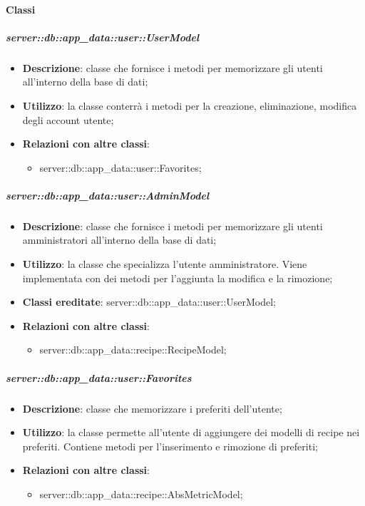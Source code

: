 	\paragraph{Classi} %

		\subparagraph{server::db::app\_data::user::UserModel} %
		\label{subp:server_db_app_data_user_user_model}
			\begin{itemize}
				\item \textbf{Descrizione}: classe che fornisce i metodi per memorizzare gli utenti all'interno della base di dati;
				\item \textbf{Utilizzo}: la classe conterrà i metodi per la creazione, eliminazione, modifica degli account utente;
				\item \textbf{Relazioni con altre classi}:
					\begin{itemize}
						\item server::db::app\_data::user::Favorites;
					\end{itemize}
			\end{itemize}


		\subparagraph{server::db::app\_data::user::AdminModel} %
		\label{subp:server_db_app_data_user_admin_model}
			\begin{itemize}
				\item \textbf{Descrizione}: classe che fornisce i metodi per memorizzare gli utenti amministratori all'interno della base di dati;
				\item \textbf{Utilizzo}: la classe che specializza l'utente amministratore. Viene implementata con dei metodi per l'aggiunta la modifica e la rimozione;
				\item \textbf{Classi ereditate}: server::db::app\_data::user::UserModel;
				\item \textbf{Relazioni con altre classi}:
					\begin{itemize}
						\item server::db::app\_data::recipe::RecipeModel;
					\end{itemize}
			\end{itemize}


		\subparagraph{server::db::app\_data::user::Favorites} %
		\label{subp:server_db_app_data_user_favorites}
			\begin{itemize}
				\item \textbf{Descrizione}: classe che memorizzare i preferiti dell'utente;
				\item \textbf{Utilizzo}: la classe  permette all'utente di aggiungere dei modelli di recipe nei preferiti. Contiene metodi per l'inserimento e rimozione di preferiti;
				\item \textbf{Relazioni con altre classi}:
					\begin{itemize}
						\item server::db::app\_data::recipe::AbsMetricModel;
					\end{itemize}
			\end{itemize}


